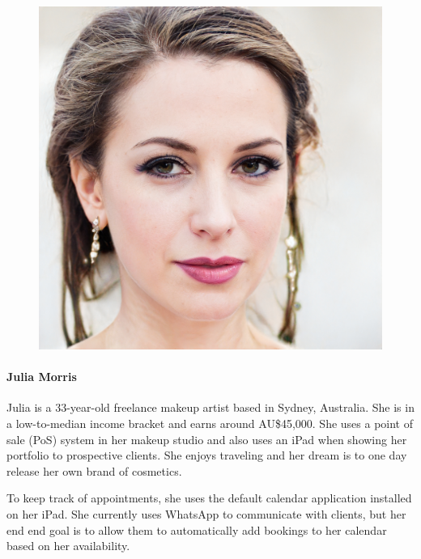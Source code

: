 \documentclass{article}
\begin{document}
\begin{figure}
	\includegraphics[scale=0.1]{persona-julia.jpg}
\end{figure}

\paragraph{Julia Morris}

Julia is a 33-year-old freelance makeup artist based in Sydney, Australia. She is in a low-to-median income bracket and earns around AU\$45,000. She uses a point of sale (PoS) system in her makeup studio and also uses an iPad when showing her portfolio to prospective clients. She enjoys traveling and her dream is to one day release her own brand of cosmetics.

To keep track of appointments, she uses the default calendar application installed on her iPad. She currently uses WhatsApp to communicate with clients, but her end end goal is to allow them to automatically add bookings to her calendar based on her availability.
\end{document}

